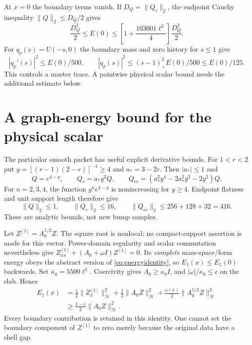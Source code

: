 \documentclass[11pt]{article}
\newcommand{\norm}[1]{\lVert #1\rVert}
\newcommand{\HH}{\mathcal H}
\begin{document}
At $x=0$ the boundary terms vanish. If $D_Q=\norm{Q_r}_2$,
the endpoint Cauchy inequality $\norm{Q}_2\le D_Q/2$ gives
\begin{equation}
 \frac{D_Q^2}{2}\le E(0)\le
       \left[1+\frac{103001\ell^2}{4}\right]\frac{D_Q^2}{2}.
 \label{eq:initialenergy}
\end{equation}
For $q_p(s)=U(-s,0)$ the boundary mass and zero history for $s\le1$
give
\begin{equation}
 |q_p'(s)|^2\le E(0)/500,\qquad
 |q_p(s)|^2\le(s-1)_+^2E(0)/500\le E(0)/125 .
 \label{eq:q}
\end{equation}
This controls a master trace. A pointwise physical scalar bound needs
the additional estimate below.

\section{A graph-energy bound for the physical scalar}
\label{sec:graph}
The particular smooth packet has useful explicit derivative bounds.
For $1<r<2$ put $y=[(r-1)(2-r)]^{-1}\ge4$ and $a_*=3-2r$.
Then $|a_*|\le1$ and
\begin{equation}
 Q=e^{4-y},\qquad Q_r=a_*y^2Q,\qquad
 Q_{rr}=(a_*^2y^4-2a_*^2y^3-2y^2)Q.
 \label{eq:bumpderivatives}
\end{equation}
For $n=2,3,4$, the function $y^ne^{4-y}$ is nonincreasing for $y\ge4$.
Endpoint flatness and unit support length therefore give
\begin{equation}
 \norm{Q}_2\le1,\qquad \norm{Q_r}_2\le16,\qquad
 \norm{Q_{rr}}_2\le256+128+32=416.
 \label{eq:bumpnorms}
\end{equation}
These are analytic bounds, not new bump samples.

Let $Z^{[1]}=A_0^{1/2}Z$. The square root is nonlocal;
no compact-support assertion is made for this vector.
Power-domain regularity and scalar commutation nevertheless give
$Z^{[1]}_{xx}+(A_0+\omega I)Z^{[1]}=0$.
Its \emph{complete} mass-space/form energy obeys the abstract version of
\eqref{eq:energyidentity}, so $E_1(x)\le E_1(0)$ backwards.
Set $\kappa_0=5500\ell^2$. Coercivity gives $A_0\ge\kappa_0I$, and
$|\omega|/\kappa_0\le\epsilon$ on the slab. Hence
\begin{equation}
\begin{aligned}
 E_1(x)&=\frac12\norm{Z^{[1]}_x}_{\HH}^2
       +\frac12\norm{A_0Z}_{\HH}^2
       +\frac{\omega(x)}2\norm{A_0^{1/2}Z}_{\HH}^2\\
 &\ge\frac{1-\epsilon}{2}\norm{A_0Z}_{\HH}^2 .
\end{aligned}
\label{eq:graphcoercive}
\end{equation}
Every boundary contribution is retained in this identity.
One cannot set the boundary component of $Z^{[1]}$ to zero merely because
the original data have a shell gap.
\end{document}
